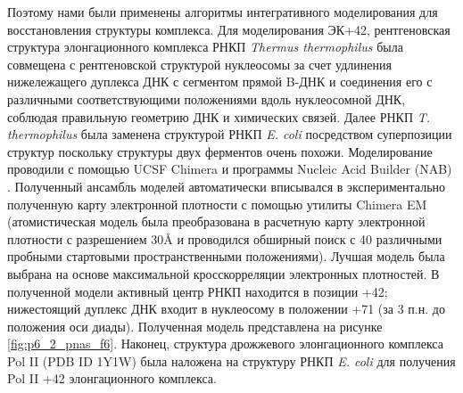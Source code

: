    Поэтому нами были применены алгоритмы интегративного моделирования для восстановления структуры комплекса.
 Для моделирования ЭК+42, рентгеновская структура элонгационного комплекса РНКП \textit{Thermus thermophilus}  \cite{vassylyev_structural_2007}  была совмещена с рентгеновской структурой  нуклеосомы \cite{davey_solvent_2002} за счет удлинения нижележащего дуплекса ДНК с сегментом прямой B-ДНК и соединения его с различными соответствующими положениями вдоль нуклеосомной ДНК, соблюдая правильную геометрию ДНК и химических связей. Далее РНКП \textit{T. thermophilus} была заменена структурой РНКП \textit{E. coli} \cite{zuo_mechanism_2013} посредством суперпозиции структур поскольку структуры двух ферментов очень похожи. Моделирование проводили с помощью UCSF  Chimera \cite{pettersen_ucsf_2004} и программы Nucleic Acid Builder (NAB) \cite{bomble_multiscale_2008}. Полученный ансамбль моделей автоматически вписывался в экспериментально полученную карту 
 электронной плотности с помощью утилиты Chimera EM (атомистическая модель была преобразована в расчетную карту электронной плотности с разрешением 30\AA{}  и проводился обширный поиск с 40 различными пробными стартовыми пространственными положениями). Лучшая модель была выбрана на основе максимальной кросскорреляции электронных плотностей. В полученной модели активный центр РНКП находится в позиции +42; нижестоящий дуплекс ДНК входит в нуклеосому в положении +71 (за 3 п.н. до положения оси диады). Полученная модель представлена на рисунке \ref{fig:p6_2_pnas_f6}.
 Наконец, структура дрожжевого элонгационного комплекса Pol II (PDB ID 1Y1W) \cite{kettenberger_complete_2004} была наложена на структуру РНКП \textit{E. coli} для получения Pol II +42 элонгационного комплекса.
   

